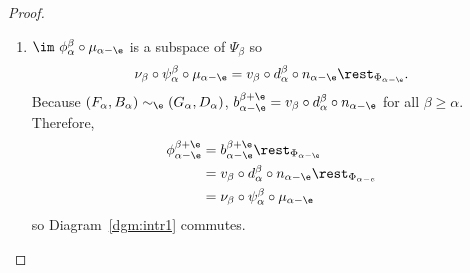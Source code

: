 \begin{proof}
  \begin{enumerate}[label=\Roman*.]
    \item $\im~\phi_\alpha^\beta\circ\mu_{\alpha-\e}$ is a subspace of $\Psi_\beta$ so
      \[ \nu_\beta\circ\psi_\alpha^\beta\circ\mu_{\alpha-\e} = v_\beta\circ d_\alpha^\beta\circ n_{\alpha-\e}\rest_{\Phi_{\alpha-\e}}.\]
      Because $(F_\alpha, B_\alpha)\sim_\e (G_\alpha, D_\alpha)$, $b_{\alpha-\e}^{\beta+\e} = v_\beta\circ d_\alpha^\beta\circ n_{\alpha-\e}$ for all $\beta\geq \alpha$.
      Therefore,
      \begin{align*}
        \phi_{\alpha-\e}^{\beta+\e} &= b_{\alpha-\e}^{\beta+\e}\rest_{\Phi_{\alpha-\e}}\\
          &= v_\beta\circ d_\alpha^\beta\circ n_{\alpha-\e}\rest_{\Phi_{\alpha-e}}\\
          &= \nu_\beta\circ\psi_\alpha^\beta\circ\mu_{\alpha-\e}
      \end{align*}
      so Diagram~\ref{dgm:intr1} commutes.


\end{enumerate}
\end{proof}
